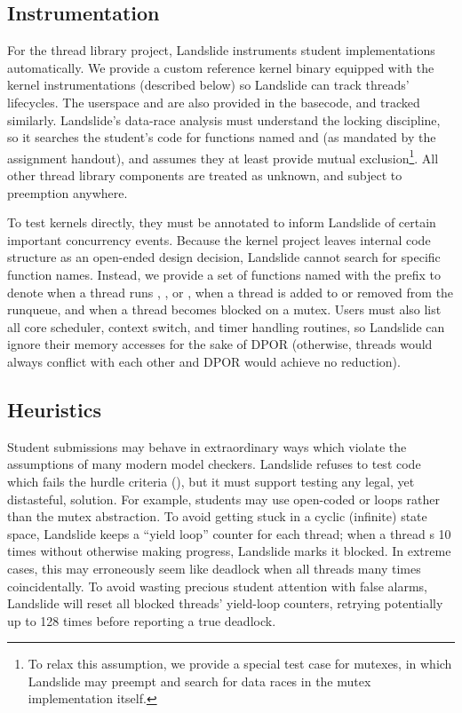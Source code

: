 \subsection{Instrumentation}

For the thread library project, Landslide instruments student implementations automatically.
We provide a custom reference kernel binary equipped with the kernel instrumentations (described below)
so Landslide can track threads' lifecycles. %
The userspace  and  are also provided in the basecode, and tracked similarly.
Landslide's data-race analysis must understand the locking discipline,
so it searches the student's code for functions named  and  (as mandated by the assignment handout),
and assumes they at least provide mutual exclusion\footnote{
	To relax this assumption, we provide a special test case for mutexes,
	in which Landslide may preempt and search for data races in the mutex implementation itself.
}.
All other thread library components are treated as unknown, and subject to preemption anywhere.

To test \pebbles kernels directly, they must be annotated to inform Landslide of certain important concurrency events.
Because the kernel project leaves internal code structure as an open-ended design decision,
Landslide cannot search for specific function names. %
Instead, we provide a set of functions named with the prefix 
to denote when a thread runs , , or , when a thread is added to or removed from the runqueue, and when a thread becomes blocked on a mutex.
Users must also list all core scheduler, context switch, and timer handling routines, so Landslide can ignore their memory accesses for the sake of DPOR
(otherwise, threads would always conflict with each other and DPOR would achieve no reduction).

\subsection{Heuristics}

Student submissions may behave in extraordinary ways which violate the assumptions of many modern model checkers.
Landslide refuses to test code which fails the hurdle criteria (\sect{\ref{sec:grading}}),
but it must support testing any legal, yet distasteful, solution.
For example, students may use open-coded  or  loops rather than the mutex abstraction. %
To avoid getting stuck in a cyclic (infinite) state space, Landslide keeps a ``yield loop'' counter for each thread;
when a thread s 10 times without otherwise making progress, Landslide marks it blocked.
%
In extreme cases, this may erroneously seem like deadlock when all threads  many times coincidentally.
To avoid wasting precious student attention with false alarms, %
Landslide will reset all blocked threads' yield-loop counters,
retrying potentially up to 128 times before reporting a true deadlock.

